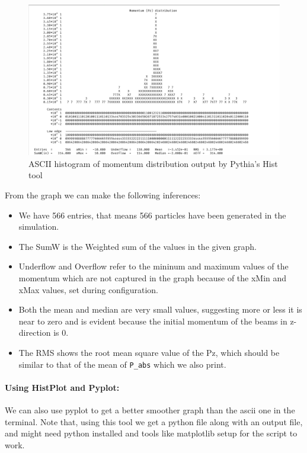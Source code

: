 \documentclass[letterpaper,12pt]{article}
\begin{document}
\begin{spacing}{1.125}
\begin{figure}[!hb]
  \includegraphics[width=\textwidth]{graph-text.png}
  \caption{ASCII histogram of momentum distribution output by Pythia's Hist tool}
  \label{graph-text}
\end{figure}

From the graph we can make the following inferences:
\begin{itemize}
  \item We have 566 entries, that means 566 particles have been generated in the
    simulation.
  \item The SumW is the Weighted sum of the values in the given graph.
  \item Underflow and Overflow refer to the mininum and maximum values of the
    momentum which are not captured in the graph because of the xMin and xMax
    values, set during configuration.
  \item Both the mean and median are very small values, suggesting more or less
    it is near to zero and is evident because the initial momentum of the beams
    in z-direction is 0.
  \item The RMS shows the root mean square value of the Pz, which should be
    similar to that of the mean of \texttt{P\_abs} which we also print.
\end{itemize}


\paragraph{Using HistPlot and Pyplot: } We can also use pyplot to get a better smoother graph than the ascii one in the
terminal. Note that, using this tool we get a python file along with an output
file, and might need python installed and tools like matplotlib setup for the script to work.


\end{spacing}
\end{document}
